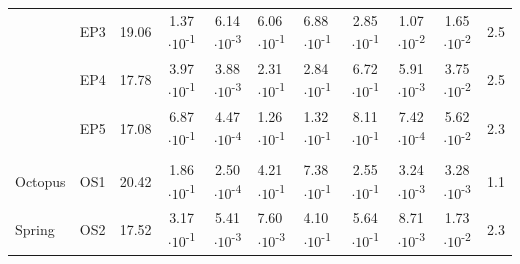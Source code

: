 {\begin{landscape}
\begin{table}
\begin{adjustbox}{width=600pt,keepaspectratio}
\begin{threeparttable}
\begin{tabular}{lccccllcccc}
      & EP3   & 19.06 & 1.37$\cdot 10$\textsuperscript{-1} & 6.14$\cdot 10$\textsuperscript{-3} & 6.06$\cdot 10$\textsuperscript{-1} & 6.88$\cdot 10$\textsuperscript{-1} & 2.85$\cdot 10$\textsuperscript{-1} & 1.07$\cdot 10$\textsuperscript{-2} & 1.65$\cdot 10$\textsuperscript{-2} & 2.5 \\
      & EP4   & 17.78 & 3.97$\cdot 10$\textsuperscript{-1} & 3.88$\cdot 10$\textsuperscript{-3} & 2.31$\cdot 10$\textsuperscript{-1} & 2.84$\cdot 10$\textsuperscript{-1} & 6.72$\cdot 10$\textsuperscript{-1} & 5.91$\cdot 10$\textsuperscript{-3} & 3.75$\cdot 10$\textsuperscript{-2} & 2.5 \\
      & EP5   & 17.08 & 6.87$\cdot 10$\textsuperscript{-1} & 4.47$\cdot 10$\textsuperscript{-4} & 1.26$\cdot 10$\textsuperscript{-1} & 1.32$\cdot 10$\textsuperscript{-1} & 8.11$\cdot 10$\textsuperscript{-1} & 7.42$\cdot 10$\textsuperscript{-4} & 5.62$\cdot 10$\textsuperscript{-2} & 2.3 \\
      &       &       &       &       &       &       &       &       &       &  \\
Octopus & OS1   & 20.42 & 1.86$\cdot 10$\textsuperscript{-1} & 2.50$\cdot 10$\textsuperscript{-4} & 4.21$\cdot 10$\textsuperscript{-1} & 7.38$\cdot 10$\textsuperscript{-1} & 2.55$\cdot 10$\textsuperscript{-1} & 3.24$\cdot 10$\textsuperscript{-3} & 3.28$\cdot 10$\textsuperscript{-3} & 1.1 \\
Spring & OS2   & 17.52 & 3.17$\cdot 10$\textsuperscript{-1} & 5.41$\cdot 10$\textsuperscript{-3} & 7.60$\cdot 10$\textsuperscript{-3} & 4.10$\cdot 10$\textsuperscript{-1} & 5.64$\cdot 10$\textsuperscript{-1} & 8.71$\cdot 10$\textsuperscript{-3} & 1.73$\cdot 10$\textsuperscript{-2} & 2.3 \\
\bottomrule
\end{tabular}%


\begin{tablenotes}
\item

\end{tablenotes}

  \label{tab:mods}
  \end{threeparttable}
  \end{adjustbox}
\end{table}

\end{landscape}
\doublespace
\clearpage
}


